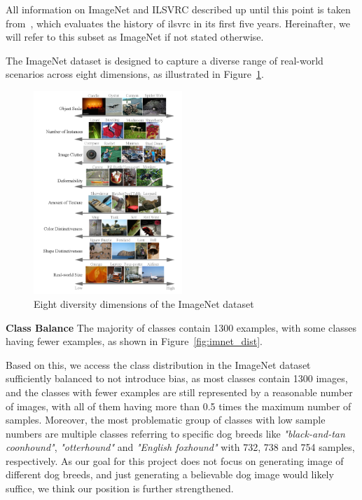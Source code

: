 All information on ImageNet and ILSVRC described up until this point is taken from~\cite{imagenet_breakdown}, which
evaluates the history of \ac{ilsvrc} in its first five years.
Hereinafter, we will refer to this subset as ImageNet if not stated otherwise.

The ImageNet dataset is designed to capture a diverse range of real-world scenarios across eight dimensions, as
illustrated in Figure~\ref{fig:imnet_dimensions}.

\begin{figure}[ht]
    \centering
    \includegraphics[width=0.5\textwidth]{../../sample_images/imnet_dimension}
    \caption{Eight diversity dimensions of the ImageNet dataset~\cite{imagenet_breakdown}}
    \label{fig:imnet_dimensions}
\end{figure}

\textbf{Class Balance}
The majority of classes contain 1300 examples, with some classes having fewer examples, as shown in
Figure~\ref{fig:imnet_dist}.

Based on this, we access the class distribution in the ImageNet dataset sufficiently balanced to not introduce bias, as
most classes contain 1300 images, and the classes with fewer examples are still represented by a reasonable number
of images, with all of them having more than 0.5 times the maximum number of samples.
Moreover, the most problematic group of classes with low sample numbers are multiple classes referring to specific dog breeds
like \textit{"black-and-tan coonhound"}, \textit{"otterhound"} and \textit{"English foxhound"} with 732,
738 and 754 samples, respectively.
As our goal for this project does not focus on generating image of different dog breeds, and just generating a
believable dog image would likely suffice, we think our position is further strengthened.

